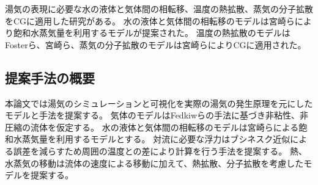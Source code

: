 湯気の表現に必要な水の液体と気体間の相転移、温度の熱拡散、蒸気の分子拡散をCGに適用した研究がある。
水の液体と気体間の相転移のモデルは宮崎ら\cite{Miyazaki2001}\cite{Miyazaki2002}により飽和水蒸気量を利用するモデルが提案された。
温度の熱拡散のモデルはFosterら\cite{Foster1997}、宮崎ら\cite{Miyazaki2002}、蒸気の分子拡散のモデルは宮崎ら\cite{Miyazaki2002}によりCGに適用された。

\subsection{提案手法の概要}
本論文では湯気のシミュレーションと可視化を実際の湯気の発生原理を元にしたモデルと手法を提案する。
気体のモデルはFedkiwら\cite{Fedkiw2001}の手法に基づき非粘性、非圧縮の流体を仮定する。
水の液体と気体間の相転移のモデルは宮崎ら\cite{Miyazaki2001}\cite{Miyazaki2002}による飽和水蒸気量を利用するモデルとする。
対流に必要な浮力はブシネスク近似による誤差を減らすため周囲の温度との差により計算を行う手法を提案する。
熱、水蒸気の移動は流体の速度による移動に加えて、熱拡散、分子拡散を考慮したモデルを提案する。

